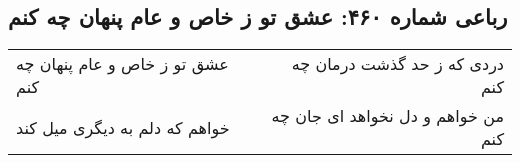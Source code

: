 \begin{center}
\section*{رباعی شماره ۴۶۰: عشق تو ز خاص و عام پنهان چه کنم}
\label{sec:sh460}
\begin{longtable}{l p{0.5cm} r}
عشق تو ز خاص و عام پنهان چه کنم
&&
دردی که ز حد گذشت درمان چه کنم
\\
خواهم که دلم به دیگری میل کند
&&
من خواهم و دل نخواهد ای جان چه کنم
\\
\end{longtable}
\end{center}
